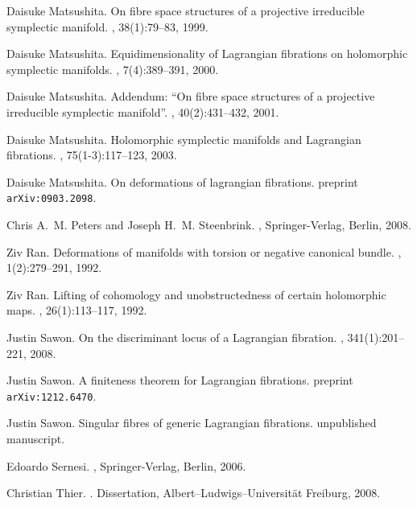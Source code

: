 \documentclass[a4paper,11pt,final]{amsart}
\theoremstyle{plain}
\theoremstyle{definition}
\numberwithin{equation}{section}
\theoremstyle{remark}
\begin{document}
\begin{thebibliography}{BHPVdV04}
Daisuke Matsushita.
\newblock On fibre space structures of a projective irreducible symplectic
  manifold.
, 38(1):79--83, 1999.

Daisuke Matsushita.
\newblock Equidimensionality of {L}agrangian fibrations on holomorphic
  symplectic manifolds.
, 7(4):389--391, 2000.

Daisuke Matsushita.
\newblock Addendum: ``{O}n fibre space structures of a projective irreducible
  symplectic manifold''.
, 40(2):431--432, 2001.

Daisuke Matsushita.
\newblock Holomorphic symplectic manifolds and {L}agrangian fibrations.
, 75(1-3):117--123, 2003.

Daisuke Matsushita.
\newblock On deformations of lagrangian fibrations.
\newblock preprint {\tt arXiv:0903.2098}.

Chris A.~M. Peters and Joseph H.~M. Steenbrink.
,
\newblock Springer-Verlag, Berlin, 2008.

Ziv Ran.
\newblock Deformations of manifolds with torsion or negative canonical bundle.
, 1(2):279--291, 1992.

Ziv Ran.
\newblock Lifting of cohomology and unobstructedness of certain holomorphic
  maps.
, 26(1):113--117, 1992.

Justin Sawon.
\newblock On the discriminant locus of a {L}agrangian fibration.
, 341(1):201--221, 2008.

Justin Sawon.
\newblock A finiteness theorem for Lagrangian fibrations.
\newblock preprint {\tt arXiv:1212.6470}.

Justin Sawon.
\newblock Singular fibres of generic Lagrangian fibrations.
\newblock unpublished manuscript.

Edoardo Sernesi.
, 
\newblock Springer-Verlag, Berlin, 2006.

Christian Thier.
.
\newblock Dissertation, Albert--{L}udwigs--{U}niversit\"at Freiburg, 2008.


\end{thebibliography}
\end{document}
